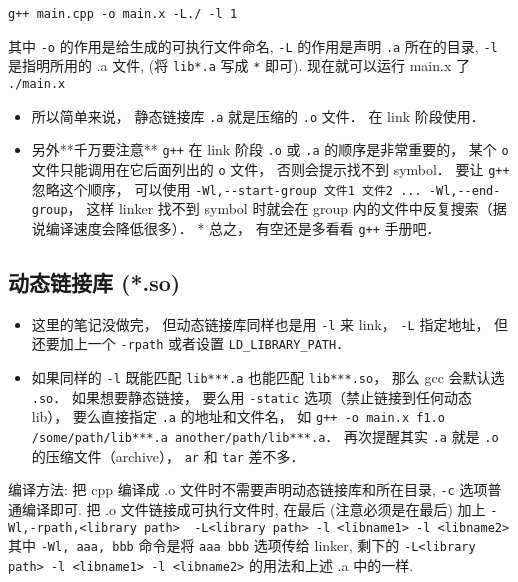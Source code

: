 \begin{lstlisting}
g++ main.cpp -o main.x -L./ -l 1
\end{lstlisting}

其中 \verb`-o` 的作用是给生成的可执行文件命名, \verb`-L` 的作用是声明 \verb`.a` 所在的目录, \verb`-l` 是指明所用的 .a 文件, (将 \verb`lib*.a` 写成 \verb`*` 即可).
现在就可以运行 main.x 了
\verb`./main.x`

\begin{itemize}
\item 所以简单来说， 静态链接库 \verb`.a` 就是压缩的 \verb`.o` 文件． 在 link 阶段使用．
\item 另外**千万要注意** \verb`g++` 在 link 阶段 \verb`.o` 或 \verb`.a` 的顺序是非常重要的， 某个 \verb`o` 文件只能调用在它后面列出的 \verb`o` 文件， 否则会提示找不到 symbol． 要让 \verb`g++` 忽略这个顺序， 可以使用
\verb`-Wl,--start-group 文件1 文件2 ... -Wl,--end-group`， 这样 linker 找不到 symbol 时就会在 group 内的文件中反复搜索（据说编译速度会降低很多）．
* 总之， 有空还是多看看 \verb`g++` 手册吧．
\end{itemize}

\subsection{动态链接库 (*.so)}
\begin{itemize}
\item 这里的笔记没做完， 但动态链接库同样也是用 \verb`-l` 来 link， \verb`-L` 指定地址， 但还要加上一个 \verb`-rpath` 或者设置 \verb`LD_LIBRARY_PATH`．
\item 如果同样的 \verb`-l` 既能匹配 \verb`lib***.a` 也能匹配 \verb`lib***.so`， 那么 gcc 会默认选 \verb`.so`． 如果想要静态链接， 要么用 \verb`-static` 选项（禁止链接到任何动态 lib）， 要么直接指定 \verb`.a` 的地址和文件名， 如 \verb`g++ -o main.x f1.o /some/path/lib***.a another/path/lib***.a`． 再次提醒其实 \verb`.a` 就是 \verb`.o` 的压缩文件（archive）， \verb`ar` 和 \verb`tar` 差不多．
\end{itemize}

编译方法:
把 cpp 编译成 .o 文件时不需要声明动态链接库和所在目录, \verb`-c` 选项普通编译即可.
把 .o 文件链接成可执行文件时, 在最后 (注意必须是在最后) 加上
\verb`-Wl,-rpath,<library path>  -L<library path> -l <libname1> -l <libname2>`
其中 \verb`-Wl, aaa, bbb` 命令是将 \verb`aaa bbb` 选项传给 linker, 剩下的 \verb`-L<library path> -l <libname1> -l <libname2>` 的用法和上述 .a 中的一样.

